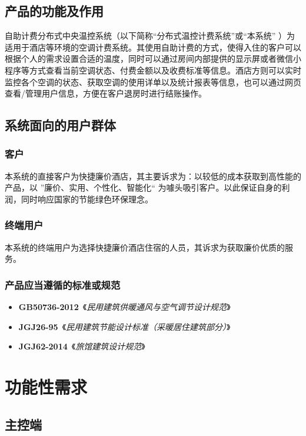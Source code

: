 \documentclass[blue,normal,cn]{elegantnote}
\begin{document}
\subsection{产品的功能及作用}
自助计费分布式中央温控系统（以下简称“分布式温控计费系统”或“本系统” ）为适用于酒店等环境的空调计费系统。其使用自助计费的方式，使得入住的客户可以根据个人的需求设置合适的温度，同时可以通过房间内部提供的显示屏或者微信小程序等方式查看当前空调状态、付费金额以及收费标准等信息。酒店方则可以实时监控各个空调的状态、获取空调的使用详单以及统计报表等信息，也可以通过网页查看/管理用户信息，方便在客户退房时进行结账操作。

\subsection{系统面向的用户群体}

\subsubsection{客户}
本系统的直接客户为快捷廉价酒店，其主要诉求为：以较低的成本获取到高性能的产品，以 ”廉价、实用、个性化、智能化“ 为噱头吸引客户。以此保证自身的利润，同时响应国家的节能绿色环保理念。

\subsubsection{终端用户}
本系统的终端用户为选择快捷廉价酒店住宿的人员，其诉求为获取廉价优质的服务。

\subsubsection{产品应当遵循的标准或规范}

\begin{itemize}
	\item \textbf{GB50736-2012}\ 《\emph{民用建筑供暖通风与空气调节设计规范}》
	\item \textbf{JGJ26-95}\ 《\emph{民用建筑节能设计标准（采暖居住建筑部分）}》
	\item \textbf{JGJ62-2014}\ 《\emph{旅馆建筑设计规范}》
\end{itemize}

\section{功能性需求}

\subsection{主控端}
\end{document}
